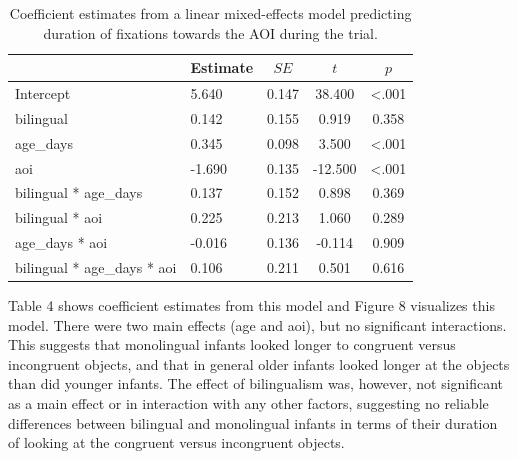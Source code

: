 \documentclass[
  english,
  ,man,floatsintext]{apa6}
\begin{document}
\begin{table}[tbp]

\begin{center}
\begin{threeparttable}

\caption{\label{tab:coef_table_duration}Coefficient estimates from a linear mixed-effects model predicting duration of fixations towards the AOI during the trial.}

\begin{tabular}{llccc}
\toprule
 & Estimate & $SE$ & $t$ & $p$\\
\midrule
Intercept & 5.640 & 0.147 & 38.400 & <.001\\
bilingual & 0.142 & 0.155 & 0.919 & 0.358\\
age\_days & 0.345 & 0.098 & 3.500 & <.001\\
aoi & -1.690 & 0.135 & -12.500 & <.001\\
bilingual * age\_days & 0.137 & 0.152 & 0.898 & 0.369\\
bilingual * aoi & 0.225 & 0.213 & 1.060 & 0.289\\
age\_days * aoi & -0.016 & 0.136 & -0.114 & 0.909\\
bilingual * age\_days * aoi & 0.106 & 0.211 & 0.501 & 0.616\\
\bottomrule
\end{tabular}

\end{threeparttable}
\end{center}

\end{table}

\noindent Table 4 shows coefficient estimates from this model and Figure 8 visualizes this model. There were two main effects (age and aoi), but no significant interactions. This suggests that monolingual infants looked longer to congruent versus incongruent objects, and that in general older infants looked longer at the objects than did younger infants. The effect of bilingualism was, however, not significant as a main effect or in interaction with any other factors, suggesting no reliable differences between bilingual and monolingual infants in terms of their duration of looking at the congruent versus incongruent objects.
\end{document}
